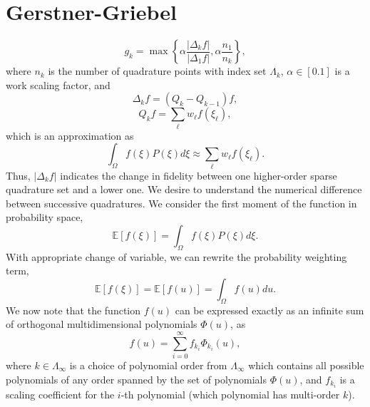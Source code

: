 \documentclass[11pt]{article}
\newcommand{\expv}[1]{\ensuremath{\mathbb{E}[ #1]}}
\begin{document}
\section{Gerstner-Griebel}
\begin{equation}
g_k = \max\left\{ \alpha\frac{|\Delta_k f|}{|\Delta_1 f|},\alpha\frac{n_1}{n_k}\right\},
\end{equation}
where $n_k$ is the number of quadrature points with index set $\Lambda_k$, $\alpha\in[0.1]$ is a work scaling factor, and
\begin{equation}
\Delta_k f = (Q_k - Q_{k-1})f,
\end{equation}
\begin{equation}
Q_k f = \sum_\ell w_\ell f(\xi_\ell),
\end{equation}
which is an approximation as
\begin{equation}
\int_\Omega f(\xi) P(\xi) d\xi \approx \sum_\ell w_\ell f(\xi_\ell).
\end{equation}
Thus, $|\Delta_k f|$ indicates the change in fidelity between one higher-order sparse quadrature set and a lower one.  We desire to understand the numerical difference between successive quadratures.  We consider the first moment of the function in probability space,
\begin{equation}
\expv{f(\xi)}=\int_\Omega f(\xi) P(\xi) d\xi.
\end{equation}
With appropriate change of variable, we can rewrite the probability weighting term,
\begin{equation}
\expv{f(\xi)}=\expv{f(u)}=\int_\Omega f(u) du.
\end{equation}
We now note that the function $f(u)$ can be expressed exactly as an infinite sum of orthogonal multidimensional polynomials $\Phi(u)$, as
\begin{equation}
f(u) = \sum_{i=0}^\infty f_{k_i} \Phi_{k_i}(u),
\end{equation}
where $k\in\Lambda_\infty$ is a choice of polynomial order from $\Lambda_\infty$ which contains all possible polynomials of any order spanned by the set of polynomials $\Phi(u)$, and $f_{k_i}$ is a scaling coefficient for the $i$-th polynomial (which polynomial has multi-order $k$).\\
\end{document}
